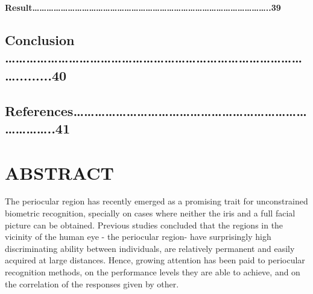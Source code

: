 \documentclass{article} %
\begin{document}
\noindent \textbf{Result{\dots}{\dots}{\dots}{\dots}{\dots}{\dots}{\dots}{\dots}{\dots}{\dots}{\dots}{\dots}{\dots}{\dots}{\dots}{\dots}{\dots}{\dots}{\dots}{\dots}{\dots}{\dots}{\dots}{\dots}{\dots}{\dots}{\dots}{\dots}{\dots}{\dots}{\dots}{\dots}{\dots}..39}

\noindent 
\subsection{Conclusion {\dots}{\dots}{\dots}{\dots}{\dots}{\dots}{\dots}{\dots}{\dots}{\dots}{\dots}{\dots}{\dots}{\dots}{\dots}{\dots}{\dots}{\dots}{\dots}{\dots}{\dots}{\dots}{\dots}{\dots}{\dots}{\dots}{\dots}{\dots}{\dots}.........40}

\noindent 
\subsection{References{\dots}{\dots}{\dots}{\dots}{\dots}{\dots}{\dots}{\dots}{\dots}{\dots}{\dots}{\dots}{\dots}{\dots}{\dots}{\dots}{\dots}{\dots}{\dots}{\dots}{\dots}{\dots}{\dots}{\dots}{\dots}{\dots}..41}

\noindent 
\subsection{}

\noindent  

\noindent  

\noindent  

\noindent  

\noindent  

\noindent  

\noindent  

\noindent  

\noindent 

\noindent 

\noindent  

\noindent  

\noindent  

\noindent  

\noindent  

\noindent  

\noindent  

\noindent 
\section{ABSTRACT}

\noindent 

\noindent                           The periocular region has recently emerged as a promising trait for unconstrained biometric recognition, specially on cases where neither the iris and a full facial picture can be obtained. Previous studies concluded that the regions in the vicinity of the human eye - the periocular region- have surprisingly high discriminating ability between individuals, are relatively permanent and easily acquired at large distances. Hence, growing attention has been paid to periocular recognition methods, on the performance levels they are able to achieve, and on the correlation of the responses given by other.
\end{document}
